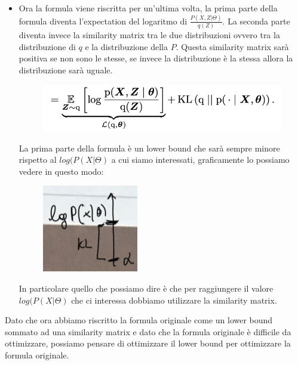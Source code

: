 \documentclass[14pt]{extreport}
\begin{document}
\begin{itemize}
	\item Ora la formula viene riscritta per un'ultima volta, la prima parte della formula diventa l'expectation del logaritmo di
	      $\frac{P(X,Z|\Theta)}{q(Z)}$. La seconda parte diventa invece la similarity matrix tra le due distribuzioni ovvero tra la distribuzione di
	      $q$ e la distribuzione della $P$. Questa similarity matrix sarà positiva se non sono le stesse, se invece la distribuzione è la stessa
	      allora la distribuzione sarà uguale.

	      \begin{figure}[H]
		      \centering
		      \includegraphics[width=0.7\linewidth]{563.jpeg}
	      \end{figure}
	      La prima parte della formula è un lower bound che sarà sempre minore rispetto al $log(P(X|\Theta)$ a cui siamo interessati, graficamente lo
	      possiamo vedere in questo modo:

	      \begin{figure}[H]
		      \centering
		      \includegraphics[width=0.7\linewidth]{562.jpeg}
	      \end{figure}
	      In particolare quello che possiamo dire è che per raggiungere il valore $log(P(X|\Theta)$ che ci interessa dobbiamo utilizzare la similarity
	      matrix.
\end{itemize}

Dato che ora abbiamo riscritto la formula originale come un lower bound sommato ad una similarity matrix e dato che la formula originale è difficile
da ottimizzare, possiamo pensare di ottimizzare il lower bound per ottimizzare la formula originale.
\end{document}
